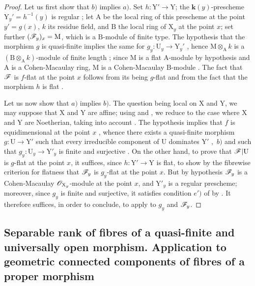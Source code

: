 \begin{proof}
\label{IV.15.4.3-proof}
Let us first show that $b)$ implies $a)$.
Set $h:\mathrm{Y}'\to\mathrm{Y}$; the $\mathbf{k}(y)$-prescheme $\mathrm{Y}_y'=h^{-1}(y)$ is regular ; let $\mathrm{A}$ be the local ring of this prescheme at the point $y'=g(x)$, $k$ its residue field, and $\mathrm{B}$ the local ring of $\mathrm{X}_y$ at the point $x$; set further $(\mathscr{F}_y)_x=\mathrm{M}$, which is a $\mathrm{B}$-module of finite type.
The hypothesis that the morphism $g$ is quasi-finite implies the same for $g_y:\mathrm{U}_y\to\mathrm{Y}_y'$ , hence $\mathrm{M}\otimes_\mathrm{A} k$ is a $(\mathrm{B}\otimes_\mathrm{A} k)$-module of finite length ; since $\mathrm{M}$ is a flat $\mathrm{A}$-module by hypothesis and $\mathrm{A}$ is a Cohen-Macaulay ring, $\mathrm{M}$ is a Cohen-Macaulay $\mathrm{B}$-module .
The fact that $\mathscr{F}$ is $f$-flat at the point $x$ follows from its being $g$-flat and from the fact that the morphism $h$ is flat .

Let us now show that $a)$ implies $b)$.
The question being local on $\mathrm{X}$ and $\mathrm{Y}$, we may suppose that $\mathrm{X}$ and $\mathrm{Y}$ are affine; using  and , we reduce to the case where $\mathrm{X}$ and $\mathrm{Y}$ are Noetherian, taking into account .
The hypothesis implies that $f$ is equidimensional at the point $x$ , whence there exists a quasi-finite morphism $g:\mathrm{U}\to\mathrm{Y}'$ such that every irreducible component of $\mathrm{U}$ dominates $\mathrm{Y}'$ ,~$b)$ and such that $g_y:\mathrm{U}_y\to\mathrm{Y}'_y$ is finite and surjective .
On the other hand, to prove that $\mathscr{F}|\mathrm{U}$ is $g$-flat at the point $x$, it suffices, since $h:\mathrm{Y}'\to\mathrm{Y}$ is flat, to show by the fibrewise criterion for flatness  that $\mathscr{F}_y$ is $g_y$-flat at the point $x$.
But by hypothesis $\mathscr{F}_y$ is a Cohen-Macaulay $\mathscr{O}_{\mathrm{X}_y}$-module at the point $x$, and $\mathrm{Y}'_y$ is a regular prescheme; moreover, since $g_y$ is finite and surjective, it satisfies condition $e')$ of  by .
It therefore suffices, in order to conclude, to apply  to $g_y$ and $\mathscr{F}_y$.
\end{proof}
\subsection{Separable rank of fibres of a quasi-finite and universally open morphism. Application to geometric connected components of fibres of a proper morphism}
\label{subsection:IV.15.5}

